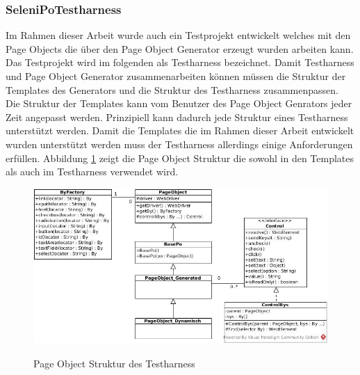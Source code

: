 \subsubsection{SeleniPoTestharness}
\label{sec:selenipotestharness}

Im Rahmen dieser Arbeit wurde auch ein Testprojekt entwickelt welches mit den Page Objects die über den Page Object Generator erzeugt wurden arbeiten kann.
Das Testprojekt wird im folgenden als Testharness bezeichnet.
Damit Testharness und Page Object Generator zusammenarbeiten können müssen die Struktur der Templates des Generators und die Struktur des Testharness zusammenpassen.
Die Struktur der Templates kann vom Benutzer des Page Object Genrators jeder Zeit angepasst werden. Prinzipiell kann dadurch jede Struktur eines Testharness unterstützt werden.
Damit die Templates die im Rahmen dieser Arbeit entwickelt wurden unterstützt werden muss der Testharness allerdings einige Anforderungen erfüllen.
Abbildung \ref{fig:strukturTestharness} zeigt die Page Object Struktur die sowohl in den Templates als auch im Testharness verwendet wird.
\begin{figure}[htb]
  \centering  
  \includegraphics[scale=0.5]{img/strukturTestharness.jpg}\\
  \caption{Page Object Struktur des Testharness}
  \label{fig:strukturTestharness}
\end{figure}

